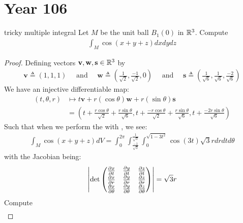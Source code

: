 \documentclass{report}
\begin{document}
\section{Year 106}
\begin{question}{tricky multiple integral}{}
Let $M$ be the unit ball  $B_1(0)$ in $\mathbb{R}^3$. Compute 
 \begin{align*}
\int_M \cos (x+y+z)dxdydz
\end{align*}
\end{question}
\begin{proof}
Defining vectors $\textbf{v},\textbf{w},\textbf{s}\in\mathbb{R}^3$ by 
\begin{align*}
\textbf{v}\triangleq (1,1,1)\quad \text{ and }\quad  \textbf{w}\triangleq \left( \frac{1}{\sqrt{2} }, \frac{-1}{\sqrt{2} },0 \right)\quad  \text{ and } \quad \textbf{s}\triangleq \left(\frac{1}{\sqrt{6}},\frac{1}{\sqrt{6}},\frac{-2}{\sqrt{6} } \right) 
\end{align*}
We have an injective differentiable map: 
\begin{align*}
(t,\theta ,r)&\mapsto  t\textbf{v}+ r (\cos \theta) \textbf{w}+ r \left(\sin \theta \right) \textbf{s} \\
&= \left( t+ \frac{r\cos \theta}{\sqrt{2} } + \frac{r\sin \theta}{\sqrt{6} }, t+ \frac{- r \cos \theta}{\sqrt{2} }+ \frac{r \sin \theta}{\sqrt{6} }, t + \frac{-2 r \sin \theta}{\sqrt{6} } \right)
\end{align*} 
Such that when we perform the  with , we see: 
\begin{align*}
\int_M \cos (x+y+z) dV= \int_0^{2\pi } \int^{\frac{1}{\sqrt{3} }}_{\frac{-1}{\sqrt{3} }} \int_0^{\sqrt{1-3t^2} } \cos (3t) \sqrt{3}r dr dt d\theta  
\end{align*}
with the Jacobian being: 
\begin{align*}
\left|\operatorname{det} \begin{pmatrix} 
      \frac{\partial x}{\partial t} & \frac{\partial y}{\partial t} & \frac{\partial z}{\partial t} \\
      \frac{\partial x}{\partial r} & \frac{\partial y}{\partial r} & \frac{\partial z}{\partial r} \\
      \frac{\partial x}{\partial \theta} & \frac{\partial y}{\partial \theta} & \frac{\partial z}{\partial \theta}
\end{pmatrix}\right| = \sqrt{3} r 
\end{align*}
Compute
\begin{align*}

\end{align*}
\end{proof}
\end{document}
